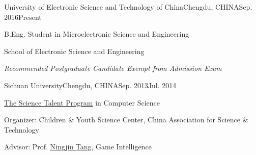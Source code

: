 
\begin{eduitem}{University of Electronic Science and Technology of China}{Chengdu, CHINA}{Sep. 2016}{Present}
\item B.Eng. Student in Microelectronic Science and Engineering
\item School of Electronic Science and Engineering
\item {\emph{Recommended Postgraduate Candidate Exempt from Admission Exam}}
\end{eduitem}

\begin{eduitem}{Sichuan University}{Chengdu, CHINA}{Sep. 2013}{Jul. 2014}
\item \href{http://ycjh.org}{The Science Talent Program} in Computer Science 
\item Organizer: Children \& Youth Science Center, China Association for Science \& Technology
\item Advisor: Prof. \href{http://cs.scu.edu.cn/info/1074/3930.htm}{Ningjiu Tang}, Game Intelligence
\end{eduitem}


\endinput